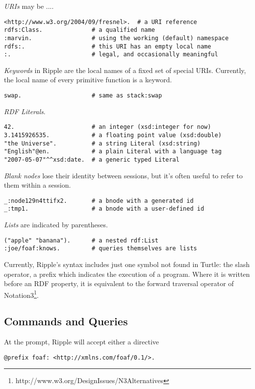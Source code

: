 \documentclass[runningheads]{llncs}
\begin{document}
\textit{URIs} may be ....
\begin{verbatim}
<http://www.w3.org/2004/09/fresnel>.  # a URI reference
rdfs:Class.              # a qualified name
:marvin.                 # using the working (default) namespace
rdfs:.                   # this URI has an empty local name
:.                       # legal, and occasionally meaningful
\end{verbatim}
\textit{Keywords} in Ripple are the local names of a fixed set of special URIs.  Currently, the local name of every primitive function is a keyword.
\begin{verbatim}
swap.                    # same as stack:swap
\end{verbatim}
\textit{RDF Literals}.
\begin{verbatim}
42.                      # an integer (xsd:integer for now)
3.1415926535.            # a floating point value (xsd:double)
"the Universe".          # a string Literal (xsd:string)
"English"@en.            # a plain Literal with a language tag
"2007-05-07"^^xsd:date.  # a generic typed Literal
\end{verbatim}
\textit{Blank nodes} lose their identity between sessions, but it's often useful to refer to them within a session.
\begin{verbatim}
_:node129n4ttifx2.       # a bnode with a generated id
_:tmp1.                  # a bnode with a user-defined id
\end{verbatim}
\textit{Lists} are indicated by parentheses.
\begin{verbatim}
("apple" "banana").      # a nested rdf:List
:joe/foaf:knows.         # queries themselves are lists
\end{verbatim}

Currently, Ripple's syntax includes just one symbol not found in Turtle: the slash operator, a prefix which indicates the execution of a program.  Where it is written before an RDF property, it is equivalent to the forward traversal operator of Notation3\footnote{http://www.w3.org/DesignIssues/N3Alternatives}.

\subsection{Commands and Queries}


At the prompt, Ripple will accept either a directive

\begin{verbatim}
@prefix foaf: <http://xmlns.com/foaf/0.1/>.
\end{verbatim}
\end{document}
